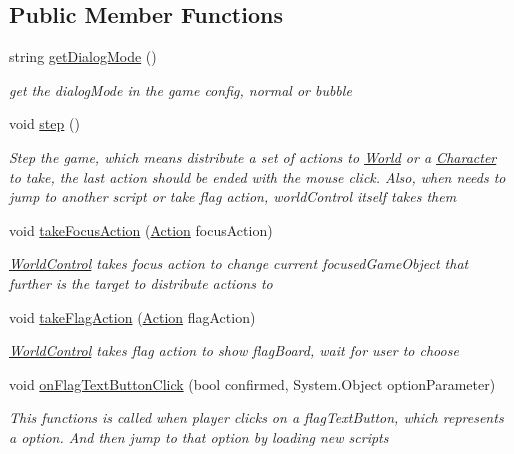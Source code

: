 \subsection*{Public Member Functions}
\begin{DoxyCompactItemize}
\item 
string \hyperlink{class_world_control_aba054b4e4ce0dcf98b09d048cf602b1b}{get\+Dialog\+Mode} ()
\begin{DoxyCompactList}\small\item\em get the dialog\+Mode in the game config, normal or bubble \end{DoxyCompactList}\item 
void \hyperlink{class_world_control_aae50af1c8330aed4910b860be14396cf}{step} ()
\begin{DoxyCompactList}\small\item\em Step the game, which means distribute a set of actions to \hyperlink{class_world}{World} or a \hyperlink{class_character}{Character} to take, the last action should be ended with the mouse click. Also, when needs to jump to another script or take flag action, world\+Control itself takes them \end{DoxyCompactList}\item 
void \hyperlink{class_world_control_a4b63c9145e7046796385126835c65bc6}{take\+Focus\+Action} (\hyperlink{classdoki_script_setting_1_1_action}{Action} focus\+Action)
\begin{DoxyCompactList}\small\item\em \hyperlink{class_world_control}{World\+Control} takes focus action to change current focused\+Game\+Object that further is the target to distribute actions to \end{DoxyCompactList}\item 
void \hyperlink{class_world_control_a62f0eb06c643028cf4219a72df9117c5}{take\+Flag\+Action} (\hyperlink{classdoki_script_setting_1_1_action}{Action} flag\+Action)
\begin{DoxyCompactList}\small\item\em \hyperlink{class_world_control}{World\+Control} takes flag action to show flag\+Board, wait for user to choose \end{DoxyCompactList}\item 
void \hyperlink{class_world_control_a27c03eb3cc7770560a69122ac3dd1ee5}{on\+Flag\+Text\+Button\+Click} (bool confirmed, System.\+Object option\+Parameter)
\begin{DoxyCompactList}\small\item\em This functions is called when player clicks on a flag\+Text\+Button, which represents a option. And then jump to that option by loading new scripts \end{DoxyCompactList}\item 

\end{DoxyCompactItemize}
